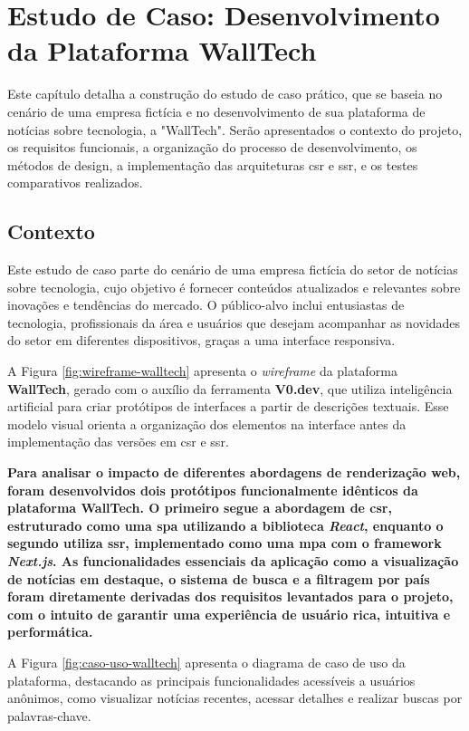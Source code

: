 \chapter{Estudo de Caso: Desenvolvimento da Plataforma WallTech}
\label{cap:estudo_caso_dev}

Este capítulo detalha a construção do estudo de caso prático, que se baseia no cenário de uma empresa fictícia e no desenvolvimento de sua plataforma de notícias sobre tecnologia, a "WallTech". Serão apresentados o contexto do projeto, os requisitos funcionais, a organização do processo de desenvolvimento, os métodos de design, a implementação das arquiteturas \acrshort{csr} e \acrshort{ssr}, e os testes comparativos realizados.
\section{Contexto}
\label{section:contexto}

Este estudo de caso parte do cenário de uma empresa fictícia do setor de notícias sobre tecnologia, cujo objetivo é fornecer conteúdos atualizados e relevantes sobre inovações e tendências do mercado. O público-alvo inclui entusiastas de tecnologia, profissionais da área e usuários que desejam acompanhar as novidades do setor em diferentes dispositivos, graças a uma interface responsiva.

A Figura \ref{fig:wireframe-walltech} apresenta o \textit{wireframe} da plataforma \textbf{WallTech}, gerado com o auxílio da ferramenta \textbf{V0.dev}, que utiliza inteligência artificial para criar protótipos de interfaces a partir de descrições textuais. Esse modelo visual orienta a organização dos elementos na interface antes da implementação das versões em \acrshort{csr} e \acrshort{ssr}.

\textbf{Para analisar o impacto de diferentes abordagens de renderização web, foram desenvolvidos dois protótipos funcionalmente idênticos da plataforma WallTech. O primeiro segue a abordagem de \acrfull{csr}, estruturado como uma \acrfull{spa} utilizando a biblioteca \textit{React}, enquanto o segundo utiliza \acrfull{ssr}, implementado como uma \acrfull{mpa} com o framework \textit{Next.js}. As funcionalidades essenciais da aplicação  como a visualização de notícias em destaque, o sistema de busca e a filtragem por país  foram diretamente derivadas dos requisitos levantados para o projeto, com o intuito de garantir uma experiência de usuário rica, intuitiva e performática.}

A Figura \ref{fig:caso-uso-walltech} apresenta o diagrama de caso de uso da plataforma, destacando as principais funcionalidades acessíveis a usuários anônimos, como visualizar notícias recentes, acessar detalhes e realizar buscas por palavras-chave.


